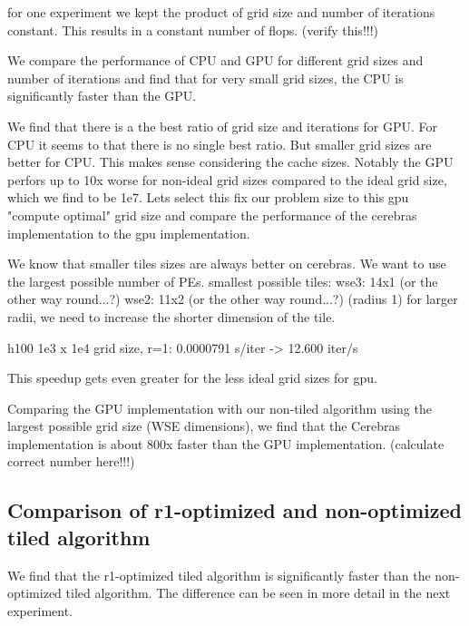 \documentclass{article}
\begin{document}
for one experiment we kept the product of grid size and number of iterations constant. This results in a constant number of flops. (verify this!!!)

We compare the performance of CPU and GPU for different grid sizes and number of iterations and find that for very small grid sizes, the CPU is significantly faster than the GPU.

We find that there is a the best ratio of grid size and iterations for GPU. For CPU it seems to that there is no single best ratio.
But smaller grid sizes are better for CPU. This makes sense considering the cache sizes.
Notably the GPU perfors up to 10x worse for non-ideal grid sizes compared to the ideal grid size, which we find to be 1e7.
Lets select this fix our problem size to this gpu "compute optimal" grid size and compare the performance of the cerebras implementation to the gpu implementation.

We know that smaller tiles sizes are always better on cerebras. We want to use the largest possible number of PEs.
smallest possible tiles: wse3: 14x1 (or the other way round...?)
wse2: 11x2 (or the other way round...?)
(radius 1)
for larger radii, we need to increase the shorter dimension of the tile.



h100 1e3 x 1e4 grid size, r=1: 0.0000791 s/iter -> 12.600 iter/s





This speedup gets even greater for the less ideal grid sizes for gpu.

Comparing the GPU implementation with our non-tiled algorithm using the largest possible grid size (WSE dimensions), we find that the Cerebras implementation is about 800x faster than the GPU implementation. (calculate correct number here!!!)

\subsection{Comparison of r1-optimized and non-optimized tiled algorithm}
We find that the r1-optimized tiled algorithm is significantly faster than the non-optimized tiled algorithm.
The difference can be seen in more detail in the next experiment.
\end{document}
